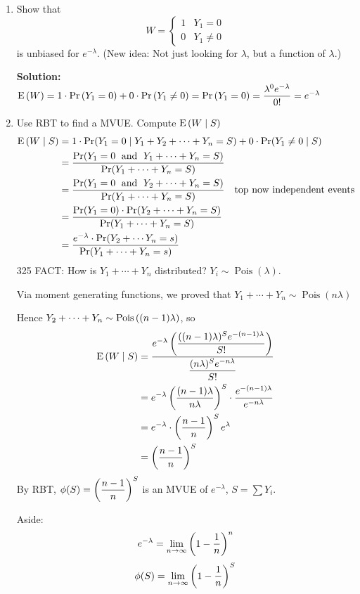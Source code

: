 \begin{enumerate}[label={\alph*})]
    \item Show that
    $$W= \begin{cases} 1 & Y_1 = 0\\0 & Y_1 \neq 0\end{cases}$$
    is unbiased for $e^{-\lambda}$. (New idea: Not just looking for $\lambda$, but a function of $\lambda$.)
    
    \nl \textbf{Solution:} $\E{W} = 1 \cdot \P{Y_1 = 0} + 0 \cdot \P{Y_1 \neq 0} = \P{Y_1 = 0} = \dfrac{\lambda^0 e^{-\lambda}}{0!} = e^{-\lambda}$

    \item Use RBT to find a MVUE. Compute $\E{W \mid S}$
    \begin{align}
        \E{W \mid S} &= 1 \cdot \Pr(Y_1 = 0 \mid Y_1 + Y_2 + \cdots + Y_n = S) + 0 \cdot \Pr(Y_1 \neq 0 \mid S)\notag\\
        &=\frac
        {\Pr(Y_1 = 0 \;\text{ and }\; \sumThru{Y} = S)}
        {\Pr(\sumThru{Y} = S)}\notag\\
        &= \frac
        {\Pr(Y_1 = 0 \;\text{ and }\; Y_2 + \cdots + Y_n = S)}
        {\Pr(\sumThru{Y} = S)}\quad \text{top now independent events}\notag\\
        &= \frac{\Pr(Y_1=0)\cdot \Pr(Y_2 + \cdots + Y_n = S)}{\Pr(\sumThru{Y} = S)}\notag\\
        &= \frac{ e^{-\lambda} \cdot \Pr(Y_2 + \cdots Y_n = s)}{\Pr(Y_1 + \cdots + Y_n = s)}\notag
    \end{align}
    \color{red}325 FACT: \color{black} How is $Y_1 + \cdots + Y_n$ distributed? $Y_i \sim \operatorname{Pois}(\lambda)$.
    
    \nl Via moment generating functions, we proved that $Y_1 + \cdots + Y_n \sim \operatorname{Pois}(n\lambda)$

    \nl Hence $Y_2 + \cdots + Y_n \sim \operatorname{Pois}\pars{(n-1)\lambda}$, so
    \begin{align}
        \E{W \mid S} &=
        \frac{e^{-\lambda}\pars{\dfrac{((n-1)\lambda)^S e^{-(n-1)\lambda} }{S!} } }
        {\dfrac{(n\lambda)^S e^{-n\lambda}}{S!} } \notag\\
        &= e^{-\lambda} \pars{\frac{(n-1)\lambda}{n\lambda}}^S\cdot \frac{e^{-(n-1)\lambda}}{e^{-n\lambda}} \notag\\
        &= e^{-\lambda} \cdot \pars{\frac{n-1}{n}}^S e^{\lambda}\notag\\
        &=  \pars{\frac{n-1}{n}}^S\notag
    \end{align}
    By RBT, $\displaystyle \phi(S) =  \pars{\frac{n-1}{n}}^S$ is an MVUE of $e^{-\lambda}$, $\displaystyle S = \sum Y_i$.

    \nnl Aside: $$e^{-\lambda} = \limn \pars{1-\over{n}}^n$$
    $$\phi(S) =  \limn \pars{1-\over{n}}^S$$
\end{enumerate}
